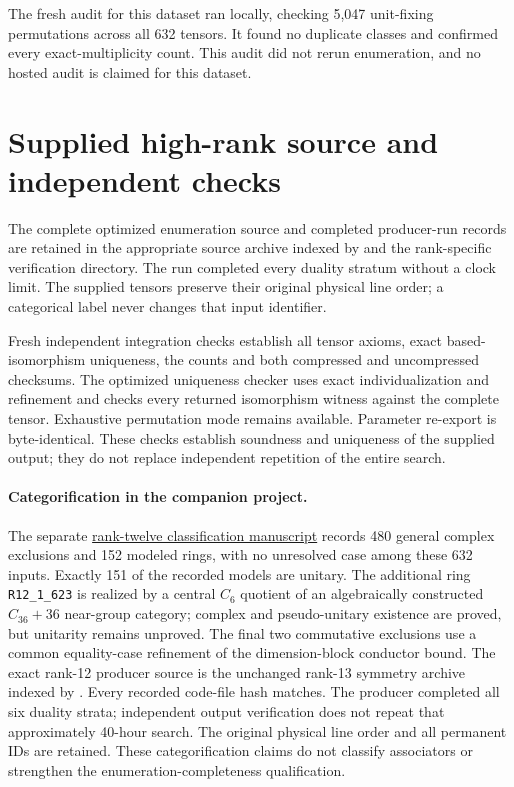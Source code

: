 \documentclass[11pt,a4paper]{article}
\theoremstyle{definition}\newtheorem{definition}[theorem]{Definition}\newtheorem{remark}[theorem]{Remark}
\begin{document}
The fresh audit for this dataset ran locally, checking 5,047 unit-fixing permutations across all 632 tensors. It found no duplicate classes and confirmed every exact-multiplicity count. This audit did not rerun enumeration, and no hosted audit is claimed for this dataset.
\section{Supplied high-rank source and independent checks}
The complete optimized enumeration source and completed producer-run records
are retained in the appropriate source archive indexed by  and the rank-specific
verification directory. The run completed every duality stratum without a
clock limit. The supplied tensors preserve their original physical line
order; a categorical label never changes that input identifier.

Fresh independent integration checks establish all tensor axioms, exact
based-isomorphism uniqueness, the counts and both compressed and uncompressed
checksums. The optimized uniqueness checker uses exact individualization and
refinement and checks every returned isomorphism witness against the complete
tensor. Exhaustive permutation mode remains available. Parameter re-export is
byte-identical. These checks establish soundness and uniqueness of the supplied
output; they do not replace independent repetition of the entire search.
\paragraph{Categorification in the companion project.}
The separate \href{https://github.com/sebastienpalcoux/grothendieck-ring-classification/tree/main/publications/rank12}{rank-twelve classification manuscript}
records 480 general complex exclusions and 152 modeled rings, with no
unresolved case among these 632 inputs. Exactly 151 of the recorded models
are unitary. The additional ring \texttt{R12\_1\_623} is realized by a central
$C_6$ quotient of an algebraically constructed $C_{36}+36$ near-group
category; complex and pseudo-unitary existence are proved, but unitarity
remains unproved. The final two commutative exclusions use a common
equality-case refinement of the dimension-block conductor bound.
The exact rank-12 producer source is the unchanged rank-13 symmetry archive
indexed by . Every recorded
code-file hash matches. The producer completed all six duality strata;
independent output verification does not repeat that approximately
40-hour search. The original physical line order and all permanent IDs
are retained. These categorification claims do not classify associators
or strengthen the enumeration-completeness qualification.
\end{document}
